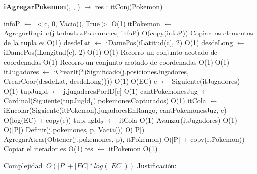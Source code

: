 \begin{algorithm}[H]{\textbf{iAgregarPokemon}(, , ) $\to$ res : itConj(Pokemon)}
	\begin{algorithmic}
		\State infoP $\gets$ $<$c, 0, Vacio(), True$>$	\Comment O(1)
		\State itPokemon $\gets$ AgregarRapido(j.todosLosPokemones, infoP)	\Comment O(copy(infoP)) {Copiar los elementos de la tupla es O(1)}
		\State desdeLat $\gets$ iDamePos(iLatitud(c), 2) \Comment O(1)
		\State desdeLong $\gets$ iDamePos(iLongitud(c), 2) \Comment O(1)
			\Comment O(1) {Recorro un conjunto acotado de coordenadas}
				\Comment O(1) {Recorro un conjunto acotado de coordenadas}
				 \Comment O(1)
						\Comment O(1)
						\State itJugadores $\gets$ iCrearIt(*(Significado(j.posicionesJugadores, CrearCoor(desdeLat, desdeLong))))	\Comment O(1)
							\Comment O(EC)
							\State e $\gets$ Siguiente(itJugadores)	\Comment O(1)
							\State tupJugId $\gets$ j.jugadoresPorID[e]	\Comment O(1)
							\State cantPokemonesJug $\gets$ Cardinal(Siguiente(tupJugId$_{1}$).pokemonesCapturados)	\Comment O(1)
							\State itCola $\gets$ iEncolar(Siguiente(itPokemon).jugadoresEnRango, cantPokemonesJug, e)	\Comment O(log(EC) + copy(e))
							\State tupJugId$_{2}$ $\gets$ itCola	\Comment O(1)
							\State Avanzar(itJugadores)	\Comment O(1)
						\EndWhile
					\EndIf
				\EndIf
			\EndWhile
		\EndWhile
			\Comment O(|P|)
			\State Definir(j.pokemones, p, Vacia())	\Comment O(|P|)
		\EndIf
		\State AgregarAtras(Obtener(j.pokemones, p), itPokemon)	\Comment O(|P| + copy(itPokemon)) {Copiar el iterador es O(1)}
		\State res $\gets$ itPokemon	\Comment O(1)
	
		\medskip
		\Statex \underline{Complejidad:} $O(|P| + |EC| * log(|EC|))$
		\Statex \underline{Justificación:}
    \end{algorithmic}
\end{algorithm}

